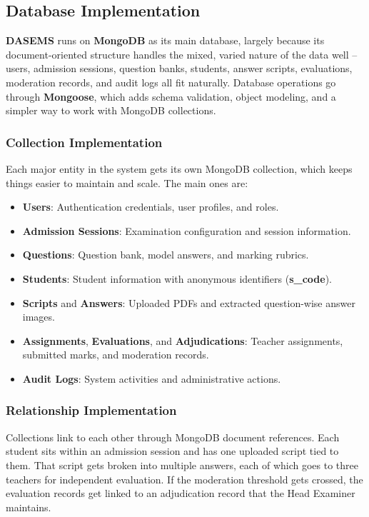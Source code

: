 \subsection{Database Implementation}

\textbf{DASEMS} runs on \textbf{MongoDB} as its main database, largely because its document-oriented structure handles the mixed, varied nature of the data well -- users, admission sessions, question banks, students, answer scripts, evaluations, moderation records, and audit logs all fit naturally. Database operations go through \textbf{Mongoose}, which adds schema validation, object modeling, and a simpler way to work with MongoDB collections.

\subsubsection{Collection Implementation}

Each major entity in the system gets its own MongoDB collection, which keeps things easier to maintain and scale. The main ones are:

\begin{itemize}
    \item \textbf{Users}: Authentication credentials, user profiles, and roles.
    \item \textbf{Admission Sessions}: Examination configuration and session information.
    \item \textbf{Questions}: Question bank, model answers, and marking rubrics.
    \item \textbf{Students}: Student information with anonymous identifiers (\textbf{s\_code}).
    \item \textbf{Scripts} and \textbf{Answers}: Uploaded PDFs and extracted question-wise answer images.
    \item \textbf{Assignments}, \textbf{Evaluations}, and \textbf{Adjudications}: Teacher assignments, submitted marks, and moderation records.
    \item \textbf{Audit Logs}: System activities and administrative actions.
\end{itemize}

\subsubsection{Relationship Implementation}

Collections link to each other through MongoDB document references. Each student sits within an admission session and has one uploaded script tied to them. That script gets broken into multiple answers, each of which goes to three teachers for independent evaluation. If the moderation threshold gets crossed, the evaluation records get linked to an adjudication record that the Head Examiner maintains.

